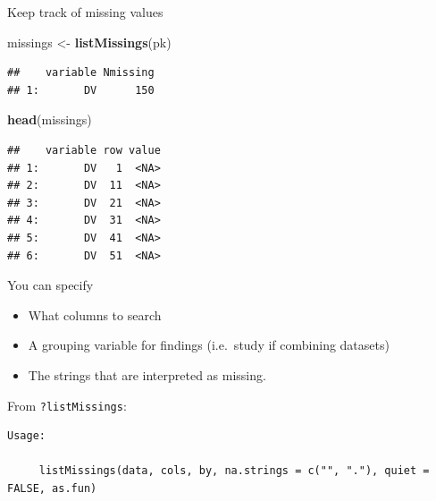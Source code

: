\documentclass[
  8pt,
  ignorenonframetext,
  aspectratio=169]{beamer}
\newenvironment{Shaded}{\begin{snugshade}}{\end{snugshade}}
\newcommand{\KeywordTok}[1]{\textcolor[rgb]{0.13,0.29,0.53}{\textbf{#1}}}
\newcommand{\NormalTok}[1]{#1}
\newcommand{\StringTok}[1]{\textcolor[rgb]{0.31,0.60,0.02}{#1}}
\providecommand{\tightlist}{%
  \setlength{\itemsep}{0pt}\setlength{\parskip}{0pt}}
\begin{document}
\begin{frame}[fragile]{Keep track of missing values}
\protect\hypertarget{keep-track-of-missing-values}{}
\begin{Shaded}
\begin{Highlighting}[]
\NormalTok{missings \textless{}{-}}\StringTok{ }\KeywordTok{listMissings}\NormalTok{(pk)}
\end{Highlighting}
\end{Shaded}

\begin{verbatim}
##    variable Nmissing
## 1:       DV      150
\end{verbatim}

\begin{Shaded}
\begin{Highlighting}[]
\KeywordTok{head}\NormalTok{(missings)}
\end{Highlighting}
\end{Shaded}

\begin{verbatim}
##    variable row value
## 1:       DV   1  <NA>
## 2:       DV  11  <NA>
## 3:       DV  21  <NA>
## 4:       DV  31  <NA>
## 5:       DV  41  <NA>
## 6:       DV  51  <NA>
\end{verbatim}

You can specify

\begin{itemize}
\tightlist
\item
  What columns to search
\item
  A grouping variable for findings (i.e.~study if combining datasets)
\item
  The strings that are interpreted as missing.
\end{itemize}

From \texttt{?listMissings}:

\begin{verbatim}
Usage:

     listMissings(data, cols, by, na.strings = c("", "."), quiet = FALSE, as.fun)
\end{verbatim}
\end{frame}
\end{document}
